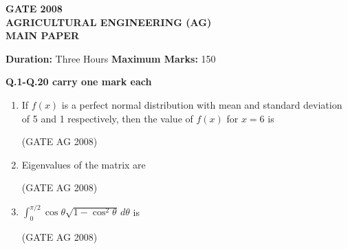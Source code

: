 \documentclass[journal,12pt,onecolumn]{IEEEtran}
\begin{document}
\begin{center}
    \textbf{\Large GATE 2008\\
    AGRICULTURAL ENGINEERING (AG)\\
    MAIN PAPER}
\end{center}

\bigskip


\textbf{Duration:} Three Hours \hfill \textbf{Maximum Marks:} 150

\textbf{Q.1-Q.20 carry one mark each}

\medskip
\begin{enumerate}
\item 
 If $f(x)$ is a perfect normal distribution with mean and standard deviation of 5 and 1 respectively, then the value of $f(x)$ for $x = 6$ is
\begin{enumerate}
\end{enumerate}
\hfill(GATE AG 2008)\\

\medskip

\item 
 Eigenvalues of the matrix
  are 
\begin{enumerate}
\end{enumerate}
\hfill(GATE AG 2008)\\

\medskip

\item  
 $\displaystyle \int_0^{\pi/2} \cos \theta \sqrt{1 - \cos^2 \theta} \, d\theta$ is 
\begin{enumerate}
\end{enumerate}
\hfill(GATE AG 2008)\\


\end{enumerate}
\end{document}
